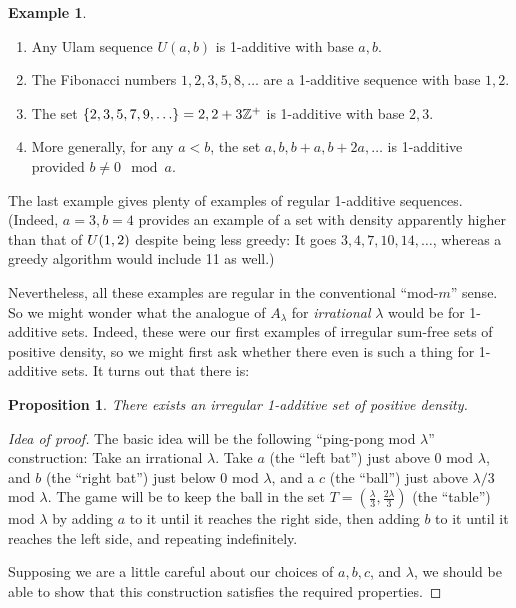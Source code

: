 \documentclass{article}
\newtheorem{proposition}[theorem]{Proposition}
\theoremstyle{definition}
\newtheorem{example}{Example}
\theoremstyle{remark}
\numberwithin{equation}{section}
\begin{document}
\begin{example}
  \begin{enumerate}
  \item Any Ulam sequence $U(a,b)$ is 1-additive with base $a, b$.  
  \item The Fibonacci numbers $1, 2, 3, 5, 8, \ldots$ are a 1-additive
    sequence with base $1, 2$.  
  \item The set $\{2, 3, 5, 7, 9, \ldots\} = 2, 2+3\mathbb{Z}^+$ is 1-additive
    with base $2, 3$.  
  \item More generally, for any $a < b$, the set $a, b, b+a, b+2a,
    \ldots$ is 1-additive provided $b \neq 0 \mod{a}$.  
  \end{enumerate}
\end{example}

The last example gives plenty of examples of regular 1-additive
sequences.  (Indeed, $a = 3, b = 4$ provides an example of a set with
density apparently higher than that of $U(1,2)$ despite being
less greedy: It goes $3, 4, 7, 10, 14, \ldots$, whereas a greedy
algorithm would include 11 as well.)  

Nevertheless, all these examples are regular in the conventional
``mod-$m$'' sense.  So we might wonder what the analogue of
$A_\lambda$ for {\em irrational} $\lambda$ would be for 1-additive sets.
Indeed, these were our first examples of irregular sum-free sets of
positive density, so we might first ask whether there even is such a
thing for 1-additive sets.  It turns out that there is:

\begin{proposition}\label{prop:irr_1add}
  There exists an irregular 1-additive set of positive density.
\end{proposition}

\begin{proof}[Idea of proof]
  The basic idea will be the following ``ping-pong mod $\lambda$''
  construction: Take an irrational $\lambda$.  Take $a$ (the ``left
  bat'') just above $0$ mod $\lambda$, and $b$ (the ``right bat'')
  just below 0 mod $\lambda$, and a $c$ (the ``ball'') just above
  $\lambda/3$ mod $\lambda$.  The game will be to keep the ball in the
  set $T = (\frac{\lambda}{3}, \frac{2\lambda}{3})$ (the ``table'')
  mod $\lambda$ by adding $a$ to it until it reaches the right side,
  then adding $b$ to it until it reaches the left side, and repeating
  indefinitely.

  Supposing we are a little careful about our choices of $a, b, c$,
  and $\lambda$, we should be able to show that this construction
  satisfies the required properties.
\end{proof}
\end{document}

